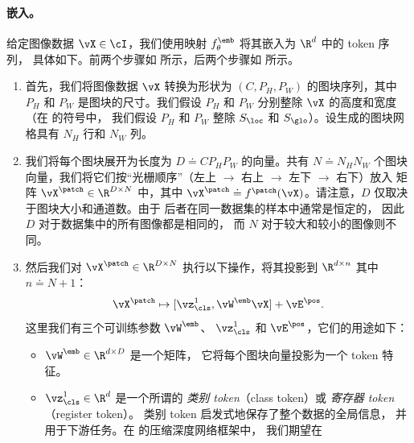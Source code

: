 \documentclass[../../book-main_zh.tex]{subfiles}
\begin{document}
\paragraph{嵌入。} 给定图像数据 \(\vX \in \cI\)，我们使用映射
\(f_{\theta}^{\emb}\) 将其嵌入为 \(\R^{d}\) 中的 token 序列，
具体如下。前两个步骤如
 所示，后两个步骤如
 所示。
\begin{enumerate}
    \item 首先，我们将图像数据 \(\vX\) 转换为形状为
        \((C, P_{H}, P_{W})\) 的图块序列，其中 \(P_{H}\) 和
        \(P_{W}\) 是图块的尺寸。我们假设 \(P_{H}\)
        和 \(P_{W}\) 分别整除 \(\vX\) 的高度和宽度
        （在  的符号中，
            我们假设
            \(P_{H}\) 和 \(P_{W}\) 整除 \(S_{\loc}\) 和
        \(S_{\glo}\)）。设生成的图块网格具有
        \(N_{H}\) 行和 \(N_{W}\) 列。
    \item 我们将每个图块展开为长度为 \(D \doteq
        CP_{H}P_{W}\) 的向量。共有 \(N \doteq N_{H}N_{W}\) 个图块
        向量，我们将它们按“光栅顺序”（左上 \(\to\)
        右上 \(\to\) 左下 \(\to\) 右下）放入
        矩阵 \(\vX^{\patch} \in \R^{D \times N}\) 中，其中
        \(\vX^{\patch} \doteq f^{\patch}(\vX)\)。请注意，\(D\)
        仅取决于图块大小和通道数。由于
        后者在同一数据集的样本中通常是恒定的，
        因此 \(D\) 对于数据集中的所有图像都是相同的，
        而 \(N\) 对于较大和较小的图像则不同。
    \item 然后我们对 \(\vX^{\patch}
        \in \R^{D \times N}\) 执行以下操作，将其投影到 \(\R^{d \times n}\)
        其中 \(n \doteq N + 1\)：
        \begin{equation}
            \vX^{\patch} \mapsto [\vz_{\cls}^{1}, \vW^{\emb}\vX] + \vE^{\pos}.
        \end{equation}
        这里我们有三个可训练参数 \(\vW^{\emb}\)、
        \(\vz_{\cls}^{1}\) 和 \(\vE^{\pos}\)，它们的用途如下：
        \begin{itemize}
            \item \(\vW^{\emb} \in \R^{d \times D}\) 是一个矩阵，
                它将每个图块向量投影为一个 token 特征。
            \item \(\vz_{\cls}^{1} \in \R^{d}\) 是一个所谓的
                \textit{类别 token}（class token）或 \textit{寄存器 token}（register token）。
                类别 token 启发式地保存了整个数据的全局信息，
                并用于下游任务。在
                 的压缩深度网络框架中，
                我们期望在

\end{itemize}
\end{enumerate}
\end{document}
